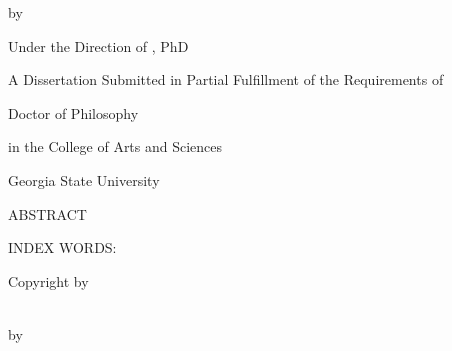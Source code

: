 \documentclass[12pt]{report}
\providecommand{\titlediss}{}
\renewenvironment{abstract}{
\begin{center}
{ABSTRACT \vspace{0.2in}}
\end{center}
}{}
\begin{document}
\begin{center}
\parbox[]{\textwidth}{\centering\titlediss}
\end{center}
\vspace{0.4in}
\centerline{by}
\vspace*{0.5in}
\centerline{}
\vspace*{0.5in}
\centerline{Under the Direction of , PhD}
\vspace{1.0in}



\centerline{A Dissertation Submitted in Partial Fulfillment of the Requirements of }
\centerline{Doctor of Philosophy}
\centerline{in the College of Arts and Sciences}
\centerline{Georgia State University}
\centerline{}
\newpage

\newpage

\begin{abstract}




\end{abstract}
\begin{singlespace}
  \vspace{0.5in}
  \noindent INDEX WORDS:
  \hspace{0.2in}
  \parbox[t]{4.5in}{}
\end{singlespace}

\newpage

\vspace*{0.7\textheight}
\begin{center}
  \parbox[]{\textwidth}{
    \begin{center}
      Copyright by \\
       \\
      
    \end{center}}
\end{center}

\newpage






\begin{center}
  \parbox[]{\textwidth}{\centering \titlediss}
  \end{center}

  \vspace*{0.5in}
  \centerline{by}
  \vspace*{0.5in}
  \centerline{}
  \vspace*{1in}
\end{document}
